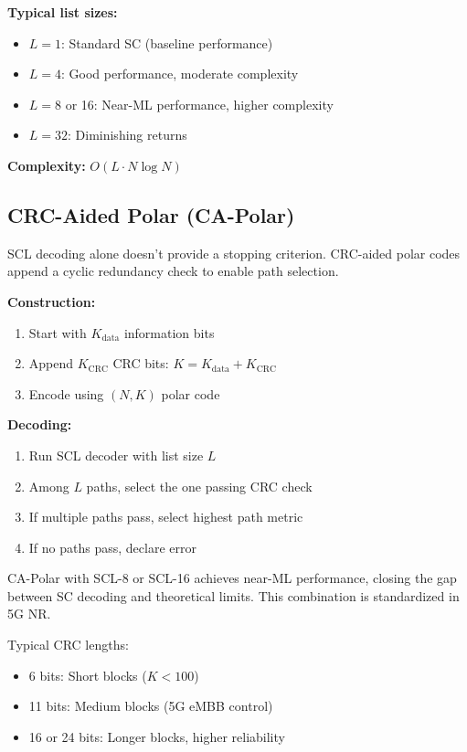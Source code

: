 \textbf{Typical list sizes:}
\begin{itemize}
\item $L = 1$: Standard SC (baseline performance)
\item $L = 4$: Good performance, moderate complexity
\item $L = 8$ or 16: Near-ML performance, higher complexity
\item $L = 32$: Diminishing returns
\end{itemize}

\textbf{Complexity:} $O(L \cdot N \log N)$

\subsection{CRC-Aided Polar (CA-Polar)}

SCL decoding alone doesn't provide a stopping criterion. CRC-aided polar codes append a cyclic redundancy check to enable path selection.

\textbf{Construction:}
\begin{enumerate}
\item Start with $K_{\text{data}}$ information bits
\item Append $K_{\text{CRC}}$ CRC bits: $K = K_{\text{data}} + K_{\text{CRC}}$
\item Encode using $(N, K)$ polar code
\end{enumerate}

\textbf{Decoding:}
\begin{enumerate}
\item Run SCL decoder with list size $L$
\item Among $L$ paths, select the one passing CRC check
\item If multiple paths pass, select highest path metric
\item If no paths pass, declare error
\end{enumerate}

\begin{keyconcept}
CA-Polar with SCL-8 or SCL-16 achieves near-ML performance, closing the gap between SC decoding and theoretical limits. This combination is standardized in 5G NR.
\end{keyconcept}

Typical CRC lengths:
\begin{itemize}
\item 6 bits: Short blocks ($K < 100$)
\item 11 bits: Medium blocks (5G eMBB control)
\item 16 or 24 bits: Longer blocks, higher reliability
\end{itemize}

